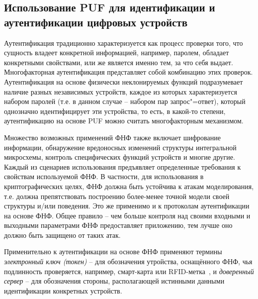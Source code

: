 \begin{enumerate}
\subsection{Использование PUF для идентификации и аутентификации цифровых устройств}
\label{sub:domain:puf_auth}
Аутентификация традиционно характеризуется как процесс проверки того, что сущность владеет конкретной информацией, например, паролем, обладает конкретными свойствами, или же является именно тем, за что себя выдает. Многофакторная аутентификация представляет собой комбинацию этих проверок. Аутентификация на основе физически неклонируемых функций подразумевает наличие разных независимых устройств, каждое из которых характеризуется набором паролей (т.е. в данном случае -- набором пар запрос"=ответ), который однозначно идентифицирует эти устройства, то есть, в какой-то степени, аутентификацию на основе PUF можно считать многофакторным механизмом.

Множество возможных применений ФНФ также включает шифрование информации, обнаружение вредоносных изменений структуры интегральной микросхемы, контроль специфических функций устройств и многие другие. Каждый из сценариев использования предъявляет определенные требования к свойствам используемой ФНФ. В частности, для использования в криптографических целях, ФНФ должна быть устойчива к атакам моделирования, т.е. должна препятствовать построению более-менее точной модели своей структуры и/или поведения. Это же применимо и к протоколам аутентификации на основе ФНФ. Общее правило -- чем больше контроля над своими входными и выходными параметрами ФНФ предоставляет приложению, тем лучше оно должно быть защищено от таких атак.

Применительно к аутентификации на основе ФНФ применяют термины \emph{электронный ключ (токен)} -- для обозначения утройства, оснащённого ФНФ, чья подлинность проверяется, например, смарт-карта или RFID-метка~\cite{rfid_puf}, и \emph{доверенный сервер} -- для обозначения стороны, располагающей истинными данными идентификации конкретных устройств.


\end{enumerate}

